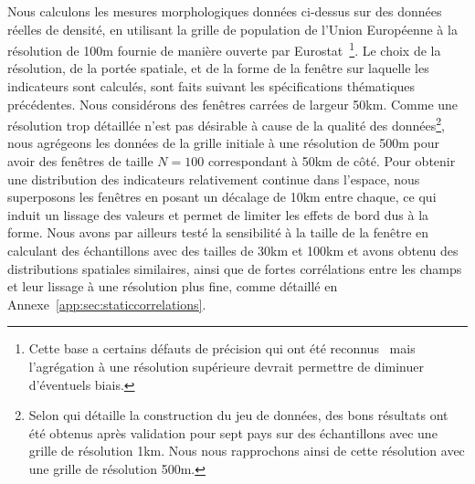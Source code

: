 {Nous calculons les mesures morphologiques données ci-dessus sur des données réelles de densité, en utilisant la grille de population de l'Union Européenne à la résolution de 100m fournie de manière ouverte par Eurostat~\cite{eurostat}\footnote{Cette base a certains défauts de précision qui ont été reconnus~\cite{bretagnolle2016ville} mais l'agrégation à une résolution supérieure devrait permettre de diminuer d'éventuels biais.}. Le choix de la résolution, de la portée spatiale, et de la forme de la fenêtre sur laquelle les indicateurs sont calculés, sont faits suivant les spécifications thématiques précédentes. Nous considérons des fenêtres carrées de largeur 50km. Comme une résolution trop détaillée n'est pas désirable à cause de la qualité des données\footnote{Selon \cite{batista2013high} qui détaille la construction du jeu de données, des bons résultats ont été obtenus après validation pour sept pays sur des échantillons avec une grille de résolution 1km. Nous nous rapprochons ainsi de cette résolution avec une grille de résolution 500m.}, nous agrégeons les données de la grille initiale à une résolution de 500m pour avoir des fenêtres de taille $N=100$ correspondant à 50km de côté. Pour obtenir une distribution des indicateurs relativement continue dans l'espace, nous superposons les fenêtres en posant un décalage de 10km entre chaque, ce qui induit un lissage des valeurs et permet de limiter les effets de bord dus à la forme. Nous avons par ailleurs testé la sensibilité à la taille de la fenêtre en calculant des échantillons avec des tailles de 30km et 100km et avons obtenu des distributions spatiales similaires, ainsi que de fortes corrélations entre les champs et leur lissage à une résolution plus fine, comme détaillé en Annexe~\ref{app:sec:staticcorrelations}.
}



